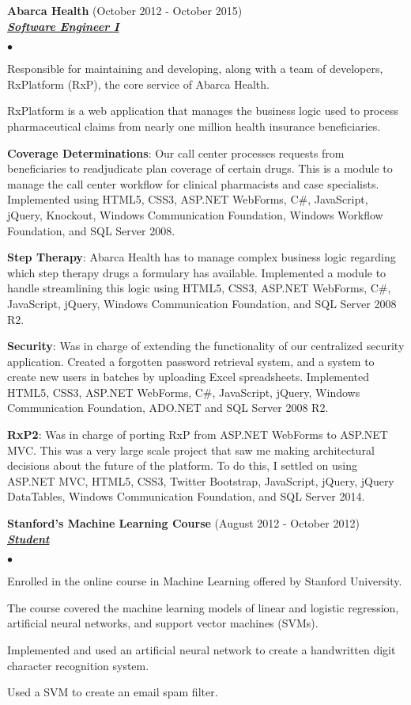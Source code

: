 \documentclass{article}
\newcommand{\employer}[3]{{ \textbf{#1} (#2)\\ \underline{\textbf{\emph{#3}}}\\  }}
\newenvironment{achievements}{\begin{list}{$\bullet$}{\topsep 0pt \itemsep -2pt}}{\vspace*{4pt}\end{list}}
\begin{document}
\employer{Abarca Health}{October 2012 - October 2015}{Software Engineer I}
	\begin{achievements}
	\item Responsible for maintaining and developing, along with a team of developers, RxPlatform (RxP), the core service of Abarca Health.
	\item RxPlatform is a web application that manages the business logic used to process pharmaceutical claims from nearly one million health insurance beneficiaries.
	\item \textbf{Coverage Determinations}: Our call center processes requests from beneficiaries to readjudicate plan coverage of certain drugs. This is a module to manage the call center workflow for clinical pharmacists and case specialists. Implemented using HTML5, CSS3, ASP.NET WebForms, C\string#, JavaScript, jQuery, Knockout, Windows Communication Foundation, Windows Workflow Foundation, and SQL Server 2008.
	\item \textbf{Step Therapy}: Abarca Health has to manage complex business logic regarding which step therapy drugs a formulary has available. Implemented a module to handle streamlining this logic using HTML5, CSS3, ASP.NET WebForms, C\string#, JavaScript, jQuery, Windows Communication Foundation, and SQL Server 2008 R2.
	\item \textbf{Security}: Was in charge of extending the functionality of our centralized security application. Created a forgotten password retrieval system, and a system to create new users in batches by uploading Excel spreadsheets. Implemented HTML5, CSS3, ASP.NET WebForms, C\string#, JavaScript, jQuery, Windows Communication Foundation, ADO.NET and SQL Server 2008 R2.
	\item \textbf{RxP2}: Was in charge of porting RxP from ASP.NET WebForms to ASP.NET MVC. This was a very large scale project that saw me making architectural decisions about the future of the platform. To do this, I settled on using ASP.NET MVC, HTML5, CSS3, Twitter Bootstrap, JavaScript, jQuery, jQuery DataTables, Windows Communication Foundation, and SQL Server 2014.
	\end{achievements}

\employer{Stanford's Machine Learning Course}{August 2012 - October 2012}{Student}
	\begin{achievements}
	\item Enrolled in the online course in Machine Learning offered by Stanford University.
	\item The course covered the machine learning models of linear and logistic regression, artificial neural networks, and support vector machines (SVMs).
	\item Implemented and used an artificial neural network to create a handwritten digit character recognition system.
	\item Used a SVM to create an email spam filter.   	
	\end{achievements}
\end{document}
